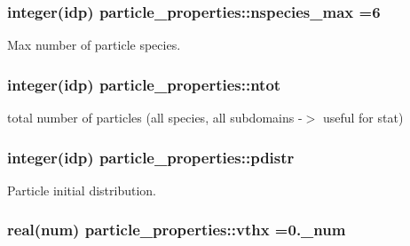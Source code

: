 \subsubsection[{\texorpdfstring{nspecies\+\_\+max}{nspecies_max}}]{\setlength{\rightskip}{0pt plus 5cm}integer(idp) particle\+\_\+properties\+::nspecies\+\_\+max =6}\hypertarget{namespaceparticle__properties_a7f6d8f4edc23a026743320958d14d534}{}\label{namespaceparticle__properties_a7f6d8f4edc23a026743320958d14d534}


Max number of particle species. 

\subsubsection[{\texorpdfstring{ntot}{ntot}}]{\setlength{\rightskip}{0pt plus 5cm}integer(idp) particle\+\_\+properties\+::ntot}\hypertarget{namespaceparticle__properties_a9fa6e3ec64928bf64db8c78d73f97389}{}\label{namespaceparticle__properties_a9fa6e3ec64928bf64db8c78d73f97389}


total number of particles (all species, all subdomains -\/$>$ useful for stat) 

\subsubsection[{\texorpdfstring{pdistr}{pdistr}}]{\setlength{\rightskip}{0pt plus 5cm}integer(idp) particle\+\_\+properties\+::pdistr}\hypertarget{namespaceparticle__properties_aaf6c9fb8697f29ccff6e1d82ee7f477a}{}\label{namespaceparticle__properties_aaf6c9fb8697f29ccff6e1d82ee7f477a}


Particle initial distribution. 

\subsubsection[{\texorpdfstring{vthx}{vthx}}]{\setlength{\rightskip}{0pt plus 5cm}real(num) particle\+\_\+properties\+::vthx =0.\+\_\+num}\hypertarget{namespaceparticle__properties_ab09cf3446a6f6d5cc0c600be909db8c1}{}\label{namespaceparticle__properties_ab09cf3446a6f6d5cc0c600be909db8c1}
